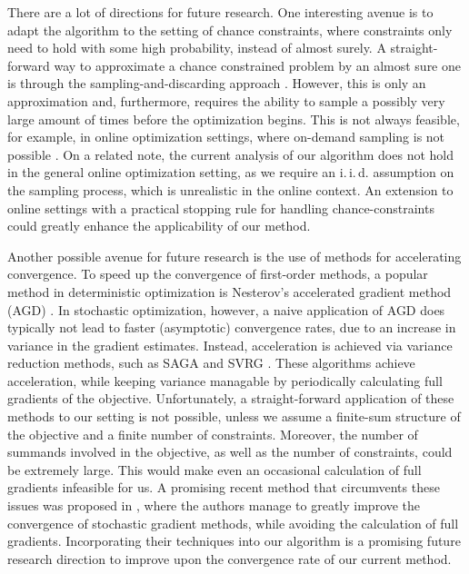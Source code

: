 There are a lot of directions for future research.
One interesting avenue is to adapt the algorithm to the setting of chance constraints, where
constraints only need to hold with some
high probability, instead of almost surely.
A straight-forward way to approximate a chance constrained problem by an
almost sure one is through the sampling-and-discarding approach
\cite{campi2011sampling}. However, this is only an approximation and, furthermore,
requires the ability to sample
a possibly very large amount of times before the optimization begins. This is not always feasible, for example,
in online optimization settings, where on-demand sampling is not possible \cite{shalev2025online}.
On a related note, the current analysis of our algorithm does not hold in the general
online optimization setting, as we require an i.\,i.\,d. assumption on the sampling process,
which is unrealistic in the online context. An extension to online settings with a practical
stopping rule for handling chance-constraints could greatly enhance the applicability of our method.

Another possible avenue for future research is the use of methods for accelerating convergence.
To speed up the convergence of first-order methods, a popular method in deterministic optimization
is Nesterov's accelerated
gradient method (AGD) \cite{nesterov1983method,nesterov2004introductory}.
In stochastic optimization, however, a naive application
of AGD does typically not lead to faster (asymptotic) convergence rates, due to an increase in variance in the gradient estimates.
Instead, acceleration is achieved via variance reduction methods, such as SAGA \cite{defazio2014saga} and SVRG \cite{johnson2013svrg}.
These algorithms achieve acceleration, while keeping variance managable by periodically calculating full gradients of the objective.
Unfortunately, a straight-forward application of these methods to our setting is not possible,
unless we assume a finite-sum structure of the objective and a finite number of constraints.
Moreover, the number of summands involved in the objective, as well as the number of constraints, could be extremely large.
This would make even an occasional calculation of full gradients infeasible for us.
A promising recent method that circumvents these issues was proposed in \cite{lei2017less}, where the authors manage
to greatly improve the convergence of stochastic gradient methods, while avoiding the calculation of full gradients.
Incorporating their techniques into our algorithm
is a promising future research direction to improve upon the convergence
rate of our current method.
